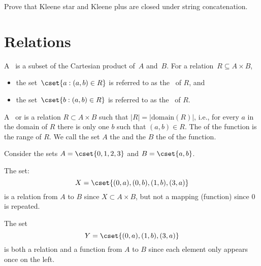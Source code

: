 
\begin{exercise}
Prove that Kleene star and Kleene plus are closed under
string concatenation. 
\end{exercise}


\section{Relations}
\label{sec:bg::relations}


\begin{definition}[Relation]

A~ is a
subset of the Cartesian product of~$A$ and~$B$.  
%
For a relation~$R \subseteq A \times B$, 
\begin{itemize}
\item the set~$\cset{a : (a,b) \in
  R}$ is referred to as the~ of $R$, and 
\item 
the set~$\cset{b
  : (a,b) \in R}$ is referred to as the~ of $R$.
\end{itemize} 
\end{definition}


\begin{definition}[Function]
A~ or
%
%
is a relation $R \subset A \times B$
such that $|R| = |\mbox{domain}(R)|$, i.e., for every $a$ in the
domain of $R$ there is only one $b$ such that $(a,b) \in R$.  
%
The  of the function is the range of $R$.
%
We call the set $A$ the  and the $B$ the 
of the function.
%
\end{definition}


\begin{example}
\label{ex:bg::relations::sequencesdef}
Consider the sets $A = \cset{0,1,2,3}$ and $B = \cset{a,b}$.

The set:
\[X = \cset{(0,a),(0,b),(1,b),(3,a)}\]
is a relation from $A$ to $B$ since $X \subset A \times B$, but not a mapping (function) since $0$
is repeated.   

The set
\[Y = \cset{(0,a),(1,b),(3,a)}\]
is both a relation and a function from $A$ to $B$ since each element
only appears once on the left.  



\end{example}

